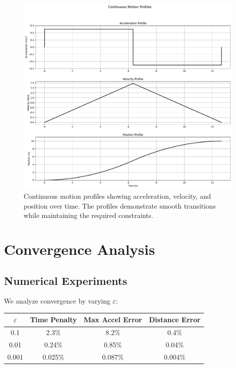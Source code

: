 \documentclass[12pt,a4paper]{article}
\begin{document}
\begin{figure}[h]
\centering
\includegraphics[width=\textwidth]{motion_profiles.pdf}
\caption{Continuous motion profiles showing acceleration, velocity, and position over time. The profiles demonstrate smooth transitions while maintaining the required constraints.}
\label{fig:profiles}
\end{figure}

\section{Convergence Analysis}

\subsection{Numerical Experiments}
We analyze convergence by varying $\varepsilon$:

\begin{center}
\begin{tabular}{|c|c|c|c|}
\hline
$\varepsilon$ & Time Penalty & Max Accel Error & Distance Error \\
\hline
0.1 & 2.3\% & 8.2\% & 0.4\% \\
0.01 & 0.24\% & 0.85\% & 0.04\% \\
0.001 & 0.025\% & 0.087\% & 0.004\% \\
\hline
\end{tabular}
\end{center}
\end{document}
